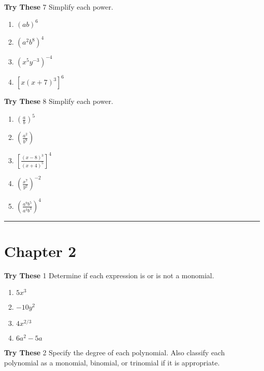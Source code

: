 \documentclass[a4paper]{JAC2003}
\begin{document}
\noindent\textcolor{red!75!black}{\textbf{Try These}} 7 Simplify each power.

\begin{enumerate}
\item $(a b)^{6}$

\item $\left(a^{2} b^{8}\right)^{4}$

\item $\left(x^{5} y^{-3}\right)^{-4}$

\item $\left[x(x+7)^{3}\right]^{6}$
\end{enumerate}


\noindent\textcolor{red!75!black}{\textbf{Try These}} 8 Simplify each power.

\begin{enumerate}
\item $\left(\frac{a}{b}\right)^{5}$

\item $\left(\frac{a^{2}}{b^{9}}\right)$

\item $\left[\frac{(x-8)^{3}}{(x+4)^{5}}\right]^{4}$

\item $\left(\frac{x^{7}}{y^{2}}\right)^{-2}$

\item $\left(\frac{a^{9} b^{5}}{a^{3} b^{3}}\right)^{4}$
\end{enumerate}

\noindent\rule[0.5ex]{\linewidth}{1pt}

\section{Chapter 2}

\noindent\textcolor{red!75!black}{\textbf{Try These}} 1 Determine if each expression is or is not a monomial.
\begin{enumerate}
\item $5 x^{3}$

\item $-10 y^{2}$

\item $4 x^{2 / 3}$

\item $6 a^{2}-5 a$
\end{enumerate}

\noindent\textcolor{red!75!black}{\textbf{Try These}} 2 Specify the degree of each polynomial. Also classify each polynomial as a monomial, binomial, or trinomial if it is appropriate.
\end{document}
